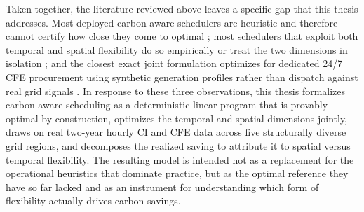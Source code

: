 Taken together, the literature reviewed above leaves a specific gap that this thesis addresses. Most deployed carbon-aware schedulers are heuristic and therefore cannot certify how close they come to optimal \citep{radovanovic2023, acun2023carbonexplorer}; most schedulers that exploit both temporal and spatial flexibility do so empirically or treat the two dimensions in isolation \citep{sukprasert2024limitations, asadov2025review}; and the closest exact joint formulation optimizes for dedicated 24/7 CFE procurement using synthetic generation profiles rather than dispatch against real grid signals \citep{riepin2024spatiotemporal}. In response to these three observations, this thesis formalizes carbon-aware scheduling as a deterministic linear program that is provably optimal by construction, optimizes the temporal and spatial dimensions jointly, draws on real two-year hourly CI and CFE data across five structurally diverse grid regions, and decomposes the realized saving to attribute it to spatial versus temporal flexibility. The resulting model is intended not as a replacement for the operational heuristics that dominate practice, but as the optimal reference they have so far lacked and as an instrument for understanding which form of flexibility actually drives carbon savings.
